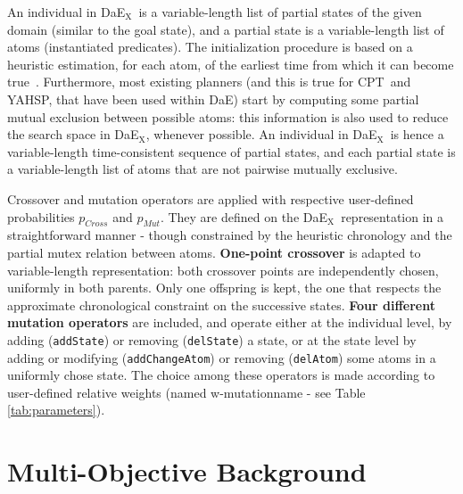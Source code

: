 \documentclass{llncs}
\def\DAE{{\sc DaE}}
\def\DAEX{{\sc DaE$_{\text{X}}$}}
\def\YAHSP{{\sc YAHSP}}
\def\CPT{{\sc CPT}}
\begin{document}
An individual in \DAEX\ is a  variable-length list of partial states of the given domain (similar to the goal state), and a partial state is a variable-length list of atoms (instantiated predicates). The initialization procedure is based on a heuristic estimation, for each atom, of the earliest time from which it can become true~\cite{Haslum2000}. Furthermore, most existing planners (and this is true for \CPT\ and \YAHSP, that have been used within \DAE) start by computing some partial mutual exclusion between possible atoms: this information is also used to reduce the search space in \DAEX, whenever possible.
An individual in \DAEX\ is hence a variable-length time-consistent sequence of partial states, and each partial state is a variable-length list of atoms that are not pairwise mutually exclusive. 

Crossover and mutation operators are applied with respective user-defined probabilities $p_{Cross}$ and $p_{Mut}$. They are defined on the \DAEX\ representation in a straightforward manner - though constrained by the heuristic chronology and the partial mutex relation between atoms.
{\bf One-point crossover} is adapted to variable-length representation: both crossover points are independently chosen, uniformly in both parents. Only one offspring is kept, the one that respects the approximate chronological constraint on the successive states. 
{\bf Four different mutation operators} are included, and operate either at the individual level, by adding ({\tt addState}) or removing ({\tt delState}) a state, or at the state level by adding or modifying ({\tt addChangeAtom}) or removing ({\tt delAtom}) some atoms in a uniformly chose state. The choice among these operators is made according to user-defined relative weights (named w-mutationname - see Table \ref{tab:parameters}). 


\section{Multi-Objective Background}
\label{sec:multi}
\end{document}
